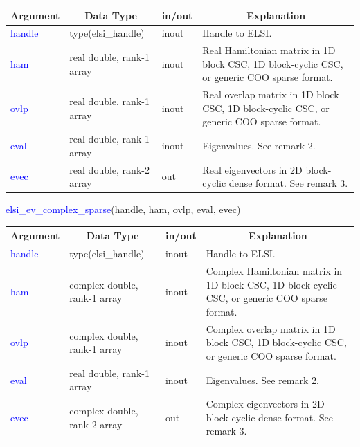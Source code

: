 \documentclass{report}
\begin{document}
\begin{table}[h]
\centering
\begin{tabular}[]{|p{20mm}|p{45mm}|p{15mm}|p{85mm}|}
\hline
\multicolumn{1}{|c|}{\textbf{Argument}} & \multicolumn{1}{c|}{\textbf{Data Type}} & \multicolumn{1}{c|}{\textbf{in/out}} & \multicolumn{1}{c|}{\textbf{Explanation}}\\
\hline
\textcolor{blue}{handle} & type(elsi\_handle)        & inout & Handle to ELSI.\\
\hline
\textcolor{blue}{ham}    & real double, rank-1 array & inout & Real Hamiltonian matrix in 1D block CSC, 1D block-cyclic CSC, or generic COO sparse format.\\
\hline
\textcolor{blue}{ovlp}   & real double, rank-1 array & inout & Real overlap matrix in 1D block CSC, 1D block-cyclic CSC, or generic COO sparse format.\\
\hline
\textcolor{blue}{eval}   & real double, rank-1 array & inout & Eigenvalues.  See remark 2.\\
\hline
\textcolor{blue}{evec}   & real double, rank-2 array & out   & Real eigenvectors in 2D block-cyclic dense format.  See remark 3.\\
\hline
\end{tabular}
\end{table}

\begin{labeling}{\hspace{6cm}}
\item [\hspace{0.3cm} \textcolor{blue}{elsi\_ev\_complex\_sparse}(handle, ham, ovlp, eval, evec)]
\end{labeling}

\begin{table}[h]
\centering
\begin{tabular}[]{|p{20mm}|p{45mm}|p{15mm}|p{85mm}|}
\hline
\multicolumn{1}{|c|}{\textbf{Argument}} & \multicolumn{1}{c|}{\textbf{Data Type}} & \multicolumn{1}{c|}{\textbf{in/out}} & \multicolumn{1}{c|}{\textbf{Explanation}}\\
\hline
\textcolor{blue}{handle} & type(elsi\_handle)           & inout & Handle to ELSI.\\
\hline
\textcolor{blue}{ham}    & complex double, rank-1 array & inout & Complex Hamiltonian matrix in 1D block CSC, 1D block-cyclic CSC, or generic COO sparse format.\\
\hline
\textcolor{blue}{ovlp}   & complex double, rank-1 array & inout & Complex overlap matrix in 1D block CSC, 1D block-cyclic CSC, or generic COO sparse format.\\
\hline
\textcolor{blue}{eval}   & real double, rank-1 array    & inout & Eigenvalues.  See remark 2.\\
\hline
\textcolor{blue}{evec}   & complex double, rank-2 array & out   & Complex eigenvectors in 2D block-cyclic dense format.  See remark 3.\\
\hline
\end{tabular}
\end{table}
\end{document}
